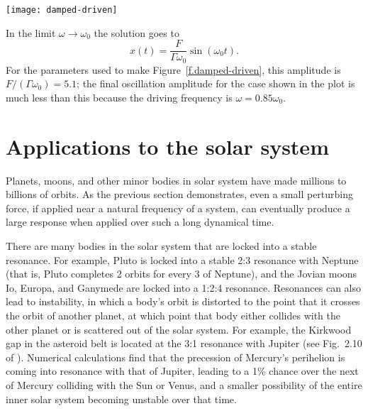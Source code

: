 \begin{figure*}[ht]
\texttt{[image: damped-driven]}
\caption[A damped, driven oscillator]{A damped, driven oscillator, with frequency $\omega_{0} = 2\pi$, damping constant $\Gamma/m = 0.04\pi$, and driving force $4.0/m\,\cos(\omega t)$ with $\omega=1.7\pi$. The light gray vertical lines indicate the period $2\pi/\omega_{0}$.
\label{f.damped-driven}}
\end{figure*}

In the limit $\omega \to \omega_{0}$ the solution goes to 
\[ x(t) = \frac{F}{\Gamma\omega_{0}} \sin(\omega_{0} t).\]
For the parameters used to make Figure~\ref{f.damped-driven}, this amplitude is $F/(\Gamma\omega_{0}) = 5.1$; the final oscillation amplitude for the case shown in the plot is much less than this because the driving frequency is $\omega = 0.85\omega_{0}$.

\section{Applications to the solar system}
Planets, moons, and other minor bodies in solar system have made millions to billions of orbits. As the previous section demonstrates, even a small perturbing force, if applied near a natural frequency of a system, can eventually produce a large response when applied over such a long dynamical time. 

There are many bodies in the solar system that are locked into a stable resonance. For example, Pluto is locked into a stable 2:3 resonance with Neptune (that is, Pluto completes 2 orbits for every 3 of Neptune), and the Jovian moons Io, Europa, and Ganymede are locked into a 1:2:4 resonance. Resonances can also lead to instability, in which a body's orbit is distorted to the point that it crosses the orbit of another planet, at which point that body either collides with the other planet or is scattered out of the solar system.  For example, the Kirkwood gap in the asteroid belt is located at the 3:1 resonance with Jupiter (see Fig.~2.10 of ). Numerical calculations find that the precession of Mercury's perihelion is coming into resonance with that of Jupiter, leading to a 1\% chance over the next  of Mercury colliding with the Sun or Venus, and a smaller possibility of the entire inner solar system becoming unstable\cite{Laskar2009Existence-of-co} over that time.

